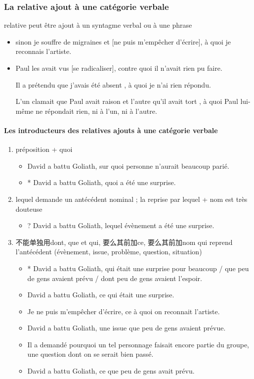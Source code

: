 \documentclass[UTF8]{report}
\begin{document}
\subsubsection{La relative ajout à une catégorie verbale}
relative peut être ajout à un syntagme verbal ou à une phrase
\begin{itemize}
    \item sinon je souffre de migraines et [ne puis m’empêcher d’écrire], à quoi je reconnais l’artiste.
    \item Paul les avait vus [se radicaliser], contre quoi il n’avait rien pu faire.
    \item [Il a prétendu que j’avais été absent], à quoi je n’ai rien répondu.
    \item [L’un clamait que Paul avait raison et l’autre qu’il avait tort], à quoi Paul lui-même ne répondait rien, ni à l’un, ni à l’autre.
\end{itemize}


\paragraph{Les introducteurs des relatives ajouts à une catégorie verbale}
\begin{enumerate}
    \item préposition + quoi
    \begin{itemize}
        \item David a battu Goliath, sur quoi personne n’aurait beaucoup parié.
        \item * David a battu Goliath, quoi a été une surprise.
    \end{itemize}
    \item lequel demande un antécédent nominal ; la reprise par lequel + nom est très douteuse
    \begin{itemize}
        \item ? David a battu Goliath, lequel évènement a été une surprise.
    \end{itemize}
    \item 不能单独用dont, que et qui, 要么其前加ce, 要么其前加nom qui reprend l’antécédent (évènement, issue, problème, question, situation) 
    \begin{itemize}
        \item * David a battu Goliath, qui était une surprise pour beaucoup / que peu de gens avaient prévu / dont peu de gens avaient l’espoir.
        \item David a battu Goliath, ce qui était une surprise.
        \item Je ne puis m’empêcher d’écrire, ce à quoi on reconnait l’artiste.
        \item David a battu Goliath, une issue que peu de gens avaient prévue.
        \item Il a demandé pourquoi un tel personnage faisait encore partie du groupe, une question dont on se serait bien passé.
        \item David a battu Goliath, ce que peu de gens avait prévu.
    \end{itemize}
\end{enumerate}
\end{document}
